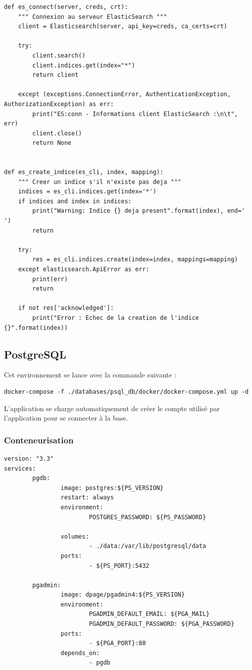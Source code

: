 \documentclass[a4paper,12pt]{article}
\begin{document}
			
				\begin{lstlisting}[title=Fonctions utiles]
def es_connect(server, creds, crt):
    """ Connexion au serveur ElasticSearch """
    client = Elasticsearch(server, api_key=creds, ca_certs=crt)

    try:
        client.search()
        client.indices.get(index="*")
        return client

    except (exceptions.ConnectionError, AuthenticationException, AuthorizationException) as err:
        print("ES:conn - Informations client ElasticSearch :\n\t", err)
        client.close()
        return None


def es_create_indice(es_cli, index, mapping):
    """ Creer un indice s'il n'existe pas deja """
    indices = es_cli.indices.get(index='*')
    if indices and index in indices:
        print("Warning: Indice {} deja present".format(index), end=' ')
        return

    try:
        res = es_cli.indices.create(index=index, mappings=mapping)
    except elasticsearch.ApiError as err:
        print(err)
        return

    if not res['acknowledged']:
        print("Error : Echec de la creation de l'indice {}".format(index))
				\end{lstlisting}
				


	\subsection{PostgreSQL} \label{PSQL}
		Cet environnement se lance avec la commande suivante :
		\begin{verbatim}
docker-compose -f ./databases/psql_db/docker/docker-compose.yml up -d		
		\end{verbatim}
		
		L'application se charge automatiquement de créer le compte utilisé par l'application pour se connecter à la base.
				
		\subsubsection{Conteneurisation}
			\begin{lstlisting}[title=DockerCompose]
version: "3.3"
services:
        pgdb:
                image: postgres:${PS_VERSION}
                restart: always
                environment:
                        POSTGRES_PASSWORD: ${PS_PASSWORD}

                volumes:
                        - ./data:/var/lib/postgresql/data
                ports:
                        - ${PS_PORT}:5432

        pgadmin:
                image: dpage/pgadmin4:${PS_VERSION}
                environment:
                        PGADMIN_DEFAULT_EMAIL: ${PGA_MAIL}
                        PGADMIN_DEFAULT_PASSWORD: ${PGA_PASSWORD}
                ports:
                        - ${PGA_PORT}:80
                depends_on:
                        - pgdb
			\end{lstlisting}
			
\end{document}

